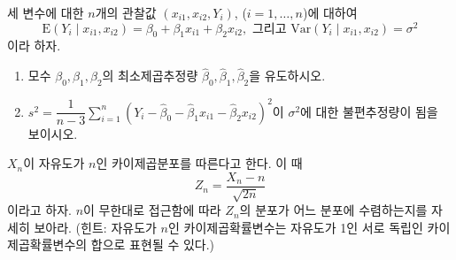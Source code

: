 \documentclass[answers]{exam}
\begin{document}
\begin{questions}
\begin{solution}
   \end{solution}
   \question
   세 변수에 대한 $n$개의 관찰값 $\left(x_{i1},x_{i2},Y_{i}\right)$, ($i=1,\ldots,n$)에 대하여
   $$
    \mathrm{E}\left(Y_{i}\;|\;x_{i1},x_{i2}\right)=\beta_{0}+\beta_{1}x_{i1}+\beta_{2}x_{i2},\text{ 그리고 } \mathrm{Var}\left(Y_{i}\;|\;x_{i1},x_{i2}\right)=\sigma^{2}
   $$
   이라 하자.
   \begin{enumerate}
    \item 모수 $\beta_{0}, \beta_{1},\beta_{2}$의 최소제곱추정량 $\widehat{\beta}_{0},\widehat{\beta}_{1},\widehat{\beta}_{2}$을 유도하시오.
    \item $s^{2}=\dfrac{1}{n-3}\displaystyle\sum_{i=1}^{n}\left(Y_{i}-\widehat{\beta}_{0}-\widehat{\beta}_{1}x_{i1}-\widehat{\beta}_{2}x_{i2}\right)^{2}$이 $\sigma^{2}$에 대한 불편추정량이 됨을 보이시오.
   \end{enumerate}
   \begin{solution}

   \end{solution}
   \question
   $X_{n}$이 자유도가 $n$인 카이제곱분포를 따른다고 한다. 이 때
   $$
    Z_{n}=\dfrac{X_{n}-n}{\sqrt{2n}}
   $$
   이라고 하자. $n$이 무한대로 접근함에 따라 $Z_{n}$의 분포가 어느 분포에 수렴하는지를 자세히 보아라. (힌트: 자유도가 $n$인 카이제곱확률변수는 자유도가 1인 서로 독립인 카이제곱확률변수의 합으로 표현될 수 있다.)
\end{questions}
\end{document}
